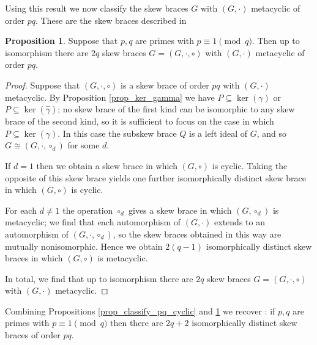 \documentclass[12pt,a4paper, reqno]{amsart}
\theoremstyle{definition}
\newtheorem{proposition}[theorem]{Proposition}
\renewcommand{\hat}{\widehat}
\begin{document}
Using this result we now classify the skew braces $ G $ with $ (G,\cdot) $ metacyclic of order $ pq $. These are the skew braces described in \cite[Main Theorem, second bullet point]{AcB20}

\begin{proposition} \label{prop_classify_pq_metacyclic}
Suppose that $ p,q $ are primes with $ p \equiv 1 \pmod{q} $. Then up to isomorphism there are $ 2q $ skew braces $ G=(G,\cdot,\circ) $ with $ (G,\cdot) $ metacyclic of order $ pq $. 
\end{proposition}
\begin{proof}
Suppose that $ (G,\cdot,\circ) $ is a skew brace of order $ pq $ with $ (G,\cdot) $ metacyclic. By Proposition \ref{prop_ker_gamma} we have $ P \subseteq \ker(\gamma) $ or $ P \subseteq \ker(\hat{\gamma}) $; no skew brace of the first kind can be isomorphic to any skew brace of the second kind, so it is sufficient to focus on the case in which $ P \subseteq \ker(\gamma) $. In this case the subskew brace $ Q $ is a left ideal of $ G $, and so $ G \cong (G,\cdot,\circ_{d}) $ for some $ d $. 

If $ d=1 $ then we obtain a skew brace in which $ (G,\circ) $ is cyclic. Taking the opposite of this skew brace yields one further isomorphically distinct skew brace in which $ (G,\circ) $ is cyclic.

For each $ d \neq 1 $ the operation $ \circ_{d} $ gives a skew brace in which $ (G,\circ_{d}) $ is metacyclic; we find that each automorphism of $ (G,\cdot) $ extends to an automorphism of $ (G,\cdot,\circ_{d}) $, so the skew braces obtained in this way are mutually nonisomorphic. Hence we obtain $ 2(q-1) $ isomorphically distinct skew braces in which $ (G,\circ) $ is metacyclic.

In total, we find that up to isomorphism there are $ 2q $ skew braces $ G=(G,\cdot,\circ) $ with $ (G,\cdot) $ metacyclic. 
\end{proof}

Combining Propositions \ref{prop_classify_pq_cyclic} and \ref{prop_classify_pq_metacyclic} we recover \cite[Main Theorem]{AcB20}: if $ p,q $ are primes with $ p \equiv 1 \pmod{q} $ then there are $ 2q+2 $ isomorphically distinct skew braces of order $ pq $. 
\end{document}

